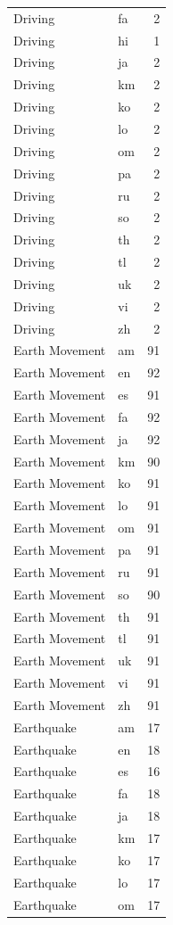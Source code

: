 \begin{longtable}{p{3cm} p{3cm} r}
Driving & fa & 2 \\
Driving & hi & 1 \\
Driving & ja & 2 \\
Driving & km & 2 \\
Driving & ko & 2 \\
Driving & lo & 2 \\
Driving & om & 2 \\
Driving & pa & 2 \\
Driving & ru & 2 \\
Driving & so & 2 \\
Driving & th & 2 \\
Driving & tl & 2 \\
Driving & uk & 2 \\
Driving & vi & 2 \\
Driving & zh & 2 \\
Earth Movement & am & 91 \\
Earth Movement & en & 92 \\
Earth Movement & es & 91 \\
Earth Movement & fa & 92 \\
Earth Movement & ja & 92 \\
Earth Movement & km & 90 \\
Earth Movement & ko & 91 \\
Earth Movement & lo & 91 \\
Earth Movement & om & 91 \\
Earth Movement & pa & 91 \\
Earth Movement & ru & 91 \\
Earth Movement & so & 90 \\
Earth Movement & th & 91 \\
Earth Movement & tl & 91 \\
Earth Movement & uk & 91 \\
Earth Movement & vi & 91 \\
Earth Movement & zh & 91 \\
Earthquake & am & 17 \\
Earthquake & en & 18 \\
Earthquake & es & 16 \\
Earthquake & fa & 18 \\
Earthquake & ja & 18 \\
Earthquake & km & 17 \\
Earthquake & ko & 17 \\
Earthquake & lo & 17 \\
Earthquake & om & 17 \\

\end{longtable}
